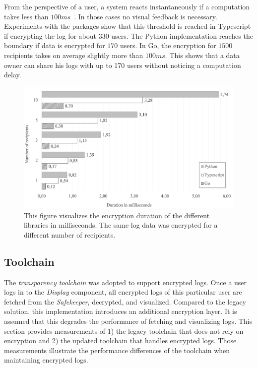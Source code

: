 \documentclass[../main.tex]{subfiles}
\begin{document}
From the perspective of a user, a system reacts instantaneously if a computation takes less than $100ms$~\cite{Nielson1993}.
In those cases no visual feedback is necessary.
Experiments with the packages show that this threshold is reached in Typescript if encrypting the log for about $330$ users.
The Python implementation reaches the boundary if data is encrypted for $170$ users.
In Go, the encryption for $1500$ recipients takes on average slightly more than $100ms$.
This shows that a data owner can share his logs with up to 170 users without noticing a computation delay.


\begin{figure}[ht]
    \includegraphics[scale=0.6]{../img/07/performance.png}
    \centering
    \caption[Encryption duration]{This figure visualizes the encryption duration of the different libraries in milliseconds. The same log data was encrypted for a different number of recipients.}
    \label{fig:performance}
\end{figure}

\subsection{Toolchain}
\label{sec:evaluation-perf-toolchain}
The \emph{transparency toolchain} was adopted to support encrypted logs.
Once a user logs in to the \emph{Display} component, all encrypted logs of this particular user are fetched from the \emph{Safekeeper}, decrypted, and visualized.
Compared to the legacy solution, this implementation introduces an additional encryption layer.
It is assumed that this degrades the performance of fetching and visualizing logs.
This section provides measurements of 
1) the legacy toolchain that does not rely on encryption and
2) the updated toolchain that handles encrypted logs.
Those measurements illustrate the performance differences of the toolchain when maintaining encrypted logs.
\end{document}
